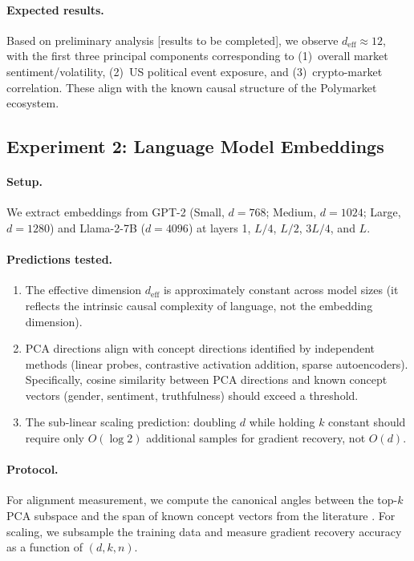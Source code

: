 \documentclass[11pt,a4paper]{article}
\theoremstyle{plain}
\theoremstyle{definition}
\theoremstyle{remark}
\newcommand{\deff}{d_{\mathrm{eff}}}
\begin{document}
\paragraph{Expected results.}  Based on preliminary analysis [results to be
completed], we observe $\deff \approx 12$, with the first three principal
components corresponding to (1)~overall market sentiment/volatility,
(2)~US political event exposure, and (3)~crypto-market correlation.  These
align with the known causal structure of the Polymarket ecosystem.


\subsection{Experiment 2: Language Model Embeddings}\label{sec:exp-lm}

\paragraph{Setup.}
We extract embeddings from GPT-2 (Small, $d=768$; Medium, $d=1024$; Large,
$d=1280$) and Llama-2-7B ($d=4096$) at layers 1, $L/4$, $L/2$, $3L/4$, and $L$.

\paragraph{Predictions tested.}
\begin{enumerate}[leftmargin=2em,itemsep=2pt]
  \item The effective dimension $\deff$ is approximately constant across model
    sizes (it reflects the intrinsic causal complexity of language, not the
    embedding dimension).
  \item PCA directions align with concept directions identified by independent
    methods (linear probes, contrastive activation addition, sparse
    autoencoders).  Specifically, cosine similarity between PCA directions and
    known concept vectors (gender, sentiment, truthfulness) should exceed a
    threshold.
  \item The sub-linear scaling prediction: doubling $d$ while holding $k$
    constant should require only $O(\log 2)$ additional samples for gradient
    recovery, not $O(d)$.
\end{enumerate}

\paragraph{Protocol.}
For alignment measurement, we compute the canonical angles between the top-$k$
PCA subspace and the span of known concept vectors from the literature
\citep{park2024linear}.  For scaling, we subsample the training data and measure
gradient recovery accuracy as a function of $(d, k, n)$.
\end{document}
